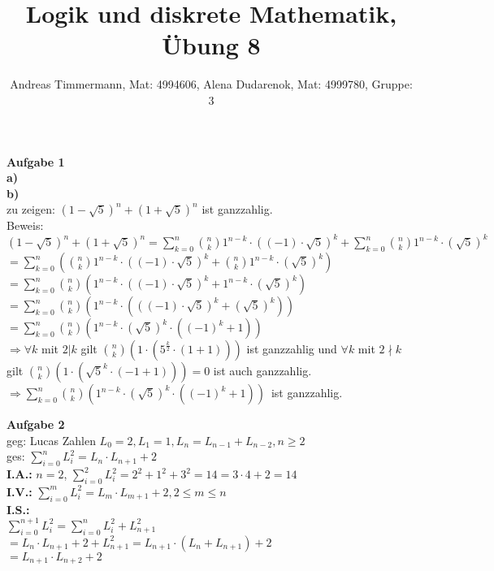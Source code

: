 \documentclass[a4paper]{scrartcl}
\title{Logik und diskrete Mathematik, Übung 8}
\author{Andreas Timmermann, Mat: 4994606, Alena Dudarenok, Mat: 4999780, Gruppe: 3}
\begin{document}
	\maketitle
	\begin{flushleft}
		\textbf{Aufgabe 1}\\
		\textbf{a)}\\
		
		\textbf{b)}\\
		zu zeigen: $(1-\sqrt{5})^n + (1+\sqrt{5})^n$ ist ganzzahlig.\\
		Beweis:\\
		$(1-\sqrt{5})^n + (1+\sqrt{5})^n = \sum\limits_{k=0}^{n}\binom{n}{k}1^{n-k}\cdot ((-1)\cdot \sqrt{5})^k + \sum\limits_{k=0}^{n}\binom{n}{k}1^{n-k}\cdot (\sqrt{5})^k$\\
		$= \sum\limits_{k=0}^{n}(\binom{n}{k}1^{n-k}\cdot ((-1)\cdot \sqrt{5})^k + \binom{n}{k}1^{n-k}\cdot (\sqrt{5})^k)$\\
		$= \sum\limits_{k=0}^{n}\binom{n}{k}(1^{n-k}\cdot ((-1)\cdot \sqrt{5})^k + 1^{n-k}\cdot (\sqrt{5})^k)$\\
		$= \sum\limits_{k=0}^{n}\binom{n}{k}(1^{n-k}\cdot (((-1)\cdot \sqrt{5})^k + (\sqrt{5})^k))$\\
		$= \sum\limits_{k=0}^{n}\binom{n}{k}(1^{n-k}\cdot (\sqrt{5})^k \cdot((-1)^k  + 1))$\\
		$\Rightarrow \forall k $ mit $2|k$ gilt $\binom{n}{k}(1\cdot (5^{\frac{k}{2}} \cdot(1  + 1)))$ ist ganzzahlig und $\forall k $ mit $2\nmid k$ gilt $\binom{n}{k}(1\cdot (\sqrt{5}^k \cdot(-1  + 1))) = 0$ ist auch ganzzahlig.\\
		$\Rightarrow \sum\limits_{k=0}^{n}\binom{n}{k}(1^{n-k}\cdot (\sqrt{5})^k \cdot((-1)^k  + 1))$\ ist ganzzahlig.\\
	\end{flushleft}
	\begin{flushleft}
		\textbf{Aufgabe 2}\\
		geg: Lucas Zahlen $L_0=2,L_1=1,L_n=L_{n-1}+L_{n-2}, n\ge 2$\\
		ges: $\sum\limits_{i=0}^{n}L_i^2=L_n\cdot L_{n+1}+2$\\[1em]
		\textbf{I.A.:} $n=2$, $\sum\limits_{i=0}^{2}L_i^2=2^2+1^2+3^2=14=3\cdot 4+2 = 14$\\ [1em]
		\textbf{I.V.:} $\sum\limits_{i=0}^{m}L_i^2=L_m\cdot L_{m+1}+2, 2\le m \le n$\\[1em]
		\textbf{I.S.:} \\
		$\sum\limits_{i=0}^{n+1}L_i^2 = \sum\limits_{i=0}^{n}L_i^2 + L_{n+1}^2$\\
		$= L_n\cdot L_{n+1}+2 + L_{n+1}^2 = L_{n+1}\cdot(L_n+L_{n+1}) + 2$\\
		$= L_{n+1}\cdot L_{n+2} + 2$\\[1em]
	\end{flushleft}
\end{document}
